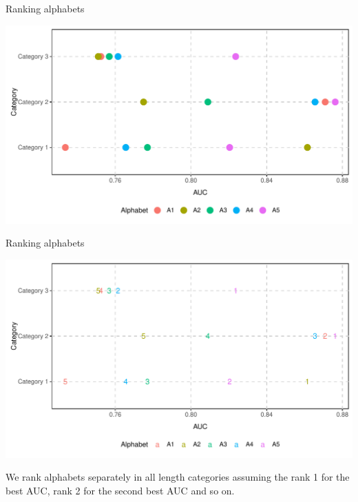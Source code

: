 \documentclass{beamer}\usepackage[]{graphicx}\usepackage[]{color}
\makeatletter
\def\maxwidth{ %
  \ifdim\Gin@nat@width>\linewidth
    \linewidth
  \else
    \Gin@nat@width
  \fi
}
\newenvironment{knitrout}{}{} %
\makeatother
\begin{document}
\begin{frame}{Ranking alphabets}
\begin{knitrout}
\color{fgcolor}

{\centering \includegraphics[width=\maxwidth]{figure/unnamed-chunk-22-1} 

}



\end{knitrout}
\end{frame}


\begin{frame}{Ranking alphabets}
\begin{knitrout}
\color{fgcolor}

{\centering \includegraphics[width=\maxwidth]{figure/unnamed-chunk-23-1} 

}



\end{knitrout}
We rank alphabets separately in all length categories assuming the rank 1 for the best AUC, rank 2 for the second best AUC and so on.


\end{frame}
\end{document}
